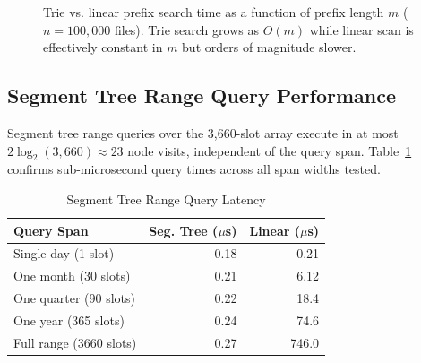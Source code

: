 \documentclass[conference]{IEEEtran}
\begin{document}
\begin{figure}[htbp]
\centering
{}
\caption{Trie vs. linear prefix search time as a function of prefix length $m$ ($n = 100{,}000$ files). Trie search grows as $O(m)$ while linear scan is effectively constant in $m$ but orders of magnitude slower.}
\label{fig:trie_perf}
\end{figure}

\subsection{Segment Tree Range Query Performance}

Segment tree range queries over the 3{,}660-slot array execute in at most $2\log_2(3{,}660) \approx 23$ node visits, independent of the query span. Table~\ref{tab:segtree_perf} confirms sub-microsecond query times across all span widths tested.

\begin{table}[htbp]
\caption{Segment Tree Range Query Latency}
\label{tab:segtree_perf}
\centering
\begin{tabular}{@{}lrr@{}}
\toprule
\textbf{Query Span} & \textbf{Seg. Tree ($\mu$s)} & \textbf{Linear ($\mu$s)} \\
\midrule
Single day (1 slot)  & 0.18 & 0.21 \\
One month (30 slots) & 0.21 & 6.12 \\
One quarter (90 slots)& 0.22 & 18.4 \\
One year (365 slots) & 0.24 & 74.6 \\
Full range (3660 slots)& 0.27 & 746.0 \\
\bottomrule
\end{tabular}
\end{table}
\end{document}
